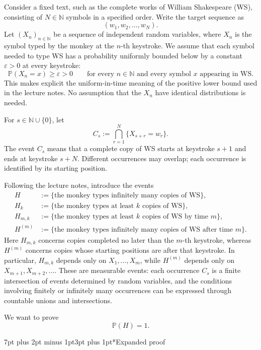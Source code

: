 \documentclass[11pt,a4paper]{article}
\makeatletter
\renewcommand{\subsubsection}{\@startsection{subsubsection}{3}{0pt}
  {7pt plus 2pt minus 1pt}{3pt plus 1pt}{\normalfont\normalsize\bfseries\boldmath\color{StudyBlue}}}
\makeatother
\begin{document}
Consider a fixed text, such as the complete works of William Shakespeare (WS), consisting of $N\in\mathbb N$ symbols in a specified order. Write the target sequence as
\[
(w_1,w_2,\ldots,w_N).
\]
Let $(X_n)_{n\in\mathbb N}$ be a sequence of independent random variables, where $X_n$ is the symbol typed by the monkey at the $n$-th keystroke. We assume that each symbol needed to type WS has a probability uniformly bounded below by a constant $\varepsilon>0$ at every keystroke:
\[
\mathbb P(X_n=x)\ge\varepsilon>0
\qquad\text{for every }n\in\mathbb N\text{ and every symbol }x
\text{ appearing in WS}.
\]
This makes explicit the uniform-in-time meaning of the positive lower bound used in the lecture notes. No assumption that the $X_n$ have identical distributions is needed.

For $s\in\mathbb N\cup\{0\}$, let
\[
C_s:=\bigcap_{r=1}^{N}\{X_{s+r}=w_r\}.
\]
The event $C_s$ means that a complete copy of WS starts at keystroke $s+1$ and ends at keystroke $s+N$. Different occurrences may overlap; each occurrence is identified by its starting position.

Following the lecture notes, introduce the events
\[
\begin{aligned}
H&:=\{\text{the monkey types infinitely many copies of WS}\},\\
H_k&:=\{\text{the monkey types at least }k\text{ copies of WS}\},\\
H_{m,k}&:=\{\text{the monkey types at least }k\text{ copies of WS by time }m\},\\
H^{(m)}&:=\{\text{the monkey types infinitely many copies of WS after time }m\}.
\end{aligned}
\]
Here $H_{m,k}$ concerns copies completed no later than the $m$-th keystroke, whereas $H^{(m)}$ concerns copies whose starting positions are after that keystroke. In particular, $H_{m,k}$ depends only on $X_1,\ldots,X_m$, while $H^{(m)}$ depends only on $X_{m+1},X_{m+2},\ldots$. These are measurable events: each occurrence $C_s$ is a finite intersection of events determined by random variables, and the conditions involving finitely or infinitely many occurrences can be expressed through countable unions and intersections.

We want to prove
\[
\mathbb P(H)=1.
\]

\subsubsection*{Expanded proof}%
%
\end{document}
